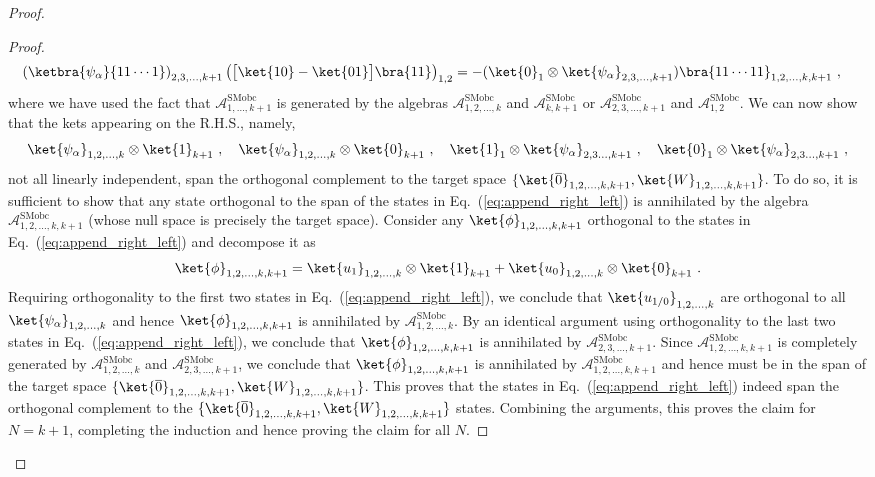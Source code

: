 \documentclass[prx,letterpaper,aps,superscriptaddress,floatfix,twocolumn,nofootinbib]{revtex4-2}
\theoremstyle{definition}
\newcommand{\mA}{\mathcal{A}}
\newcommand{\ktO}{\ket{\overline{0}}}
\newcommand{\ktW}{\ket{W}}
\begin{document}
\begin{proof}
\begin{proof}
\begin{align*}
& \left(\ketbra{\psi_\alpha}{11 \cdots 1} \right)_{2,3,\dots,k+1} \left(\big[\ket{10} - \ket{01} \big] \bra{11} \right)_{1,2} = -(\ket{0}_1 \otimes \ket{\psi_\alpha}_{2,3,\dots,k+1} ) \bra{11 \cdots 11}_{1,2,\dots,k,k+1} ~,
\end{align*}
where we have used the fact that $\mA^{\text{SMobc}}_{1,\dots,k+1}$ is generated by the algebras $\mA^{\text{SMobc}}_{1,2,\dots,k}$ and $\mA^{\text{SMobc}}_{k,k+1}$ or $\mA^{\text{SMobc}}_{2,3,\dots,k+1}$ and $\mA^{\text{SMobc}}_{1,2}$. 
%
We can now show that the kets appearing on the R.H.S., namely,
\begin{equation}
\ket{\psi_\alpha}_{1,2,\dots,k} \otimes \ket{1}_{k+1} ~, \quad
\ket{\psi_\alpha}_{1,2,\dots,k} \otimes \ket{0}_{k+1} ~, \quad 
\ket{1}_1 \otimes \ket{\psi_\alpha}_{2,3\dots,k+1} ~, \quad
\ket{0}_1 \otimes \ket{\psi_\alpha}_{2,3\dots,k+1} ~, \label{eq:append_right_left}
\end{equation}
not all linearly independent, span the orthogonal complement to the target space $\{ \ktO_{1,2,\dots,k,k+1}, \ktW_{1,2,\dots,k,k+1} \}$.
%
To do so, it is sufficient to show that any state orthogonal to the span of the states in Eq.~(\ref{eq:append_right_left}) is annihilated by the algebra $\mA_{1,2,\dots,k,k+1}^{\text{SMobc}}$ (whose null space is precisely the target space).
%
Consider any $\ket{\phi}_{1,2,\dots,k,k+1}$ orthogonal to the states in Eq.~(\ref{eq:append_right_left}) and decompose it as
%
\begin{align}
\ket{\phi}_{1,2,\dots,k,k+1} = \ket{u_1}_{1,2,\dots,k} \otimes \ket{1}_{k+1} + \ket{u_0}_{1,2,\dots,k} \otimes \ket{0}_{k+1} ~. 
\end{align}
%
Requiring orthogonality to the first two states in Eq.~(\ref{eq:append_right_left}), we conclude that $\ket{u_{1/0}}_{1,2,\dots,k}$ are orthogonal to all $\ket{\psi_{\alpha}}_{1,2,\dots,k}$ and hence $\ket{\phi}_{1,2,\dots,k,k+1}$ is annihilated by $\mA^\text{SMobc}_{1,2,\dots,k}$.
%
By an identical argument using orthogonality to the last two states in Eq.~(\ref{eq:append_right_left}), we conclude that $\ket{\phi}_{1,2,\dots,k,k+1}$ is annihilated by $\mA^\text{SMobc}_{2,3,\dots,k+1}$.
%
Since $\mA^\text{SMobc}_{1,2,\dots,k,k+1}$ is completely generated by $\mA^\text{SMobc}_{1,2,\dots,k}$ and $\mA^\text{SMobc}_{2,3,\dots,k+1}$, we conclude that $\ket{\phi}_{1,2,\dots,k,k+1}$ is annihilated by $\mA^\text{SMobc}_{1,2,\dots,k,k+1}$ and hence must be in the span of the target space $\{ \ktO_{1,2,\dots,k,k+1}, \ktW_{1,2,\dots,k,k+1} \}$.
%
This proves that the states in Eq.~(\ref{eq:append_right_left}) indeed span the orthogonal complement to the $\{ \ktO_{1,2,\dots,k,k+1}, \ktW_{1,2,\dots,k,k+1} \}$ states.
%
Combining the arguments, this proves the claim for $N = k + 1$, completing the induction and hence proving the claim for all $N$.
\end{proof}
%


\end{proof}
\end{document}
